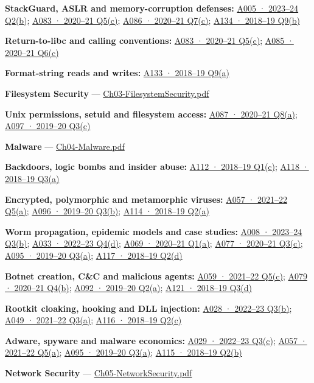 \documentclass[11pt,a4paper]{article}
\begin{document}
\textbf{StackGuard,\allowbreak{} ASLR and memory-corruption defenses:} \hyperref[a005]{A005 · 2023–24 Q2(b)}; \hyperref[a083]{A083 · 2020–21 Q5(c)}; \hyperref[a086]{A086 · 2020–21 Q7(c)}; \hyperref[a134]{A134 · 2018–19 Q9(b)}


\textbf{Return-to-libc and calling conventions:} \hyperref[a083]{A083 · 2020–21 Q5(c)}; \hyperref[a085]{A085 · 2020–21 Q6(c)}


\textbf{Format-string reads and writes:} \hyperref[a133]{A133 · 2018–19 Q9(a)}


\textbf{Filesystem Security} — \href{../slides/Ch03-FilesystemSecurity.pdf}{Ch03-FilesystemSecurity.\allowbreak{}pdf}


\textbf{Unix permissions,\allowbreak{} setuid and filesystem access:} \hyperref[a087]{A087 · 2020–21 Q8(a)}; \hyperref[a097]{A097 · 2019–20 Q3(c)}


\textbf{Malware} — \href{../slides/Ch04-Malware.pdf}{Ch04-Malware.\allowbreak{}pdf}


\textbf{Backdoors,\allowbreak{} logic bombs and insider abuse:} \hyperref[a112]{A112 · 2018–19 Q1(c)}; \hyperref[a118]{A118 · 2018–19 Q3(a)}


\textbf{Encrypted,\allowbreak{} polymorphic and metamorphic viruses:} \hyperref[a057]{A057 · 2021–22 Q5(a)}; \hyperref[a096]{A096 · 2019–20 Q3(b)}; \hyperref[a114]{A114 · 2018–19 Q2(a)}


\textbf{Worm propagation,\allowbreak{} epidemic models and case studies:} \hyperref[a008]{A008 · 2023–24 Q3(b)}; \hyperref[a033]{A033 · 2022–23 Q4(d)}; \hyperref[a069]{A069 · 2020–21 Q1(a)}; \hyperref[a077]{A077 · 2020–21 Q3(c)}; \hyperref[a095]{A095 · 2019–20 Q3(a)}; \hyperref[a117]{A117 · 2018–19 Q2(d)}


\textbf{Botnet creation,\allowbreak{} C\&C and malicious agents:} \hyperref[a059]{A059 · 2021–22 Q5(c)}; \hyperref[a079]{A079 · 2020–21 Q4(b)}; \hyperref[a092]{A092 · 2019–20 Q2(a)}; \hyperref[a121]{A121 · 2018–19 Q3(d)}


\textbf{Rootkit cloaking,\allowbreak{} hooking and DLL injection:} \hyperref[a028]{A028 · 2022–23 Q3(b)}; \hyperref[a049]{A049 · 2021–22 Q3(a)}; \hyperref[a116]{A116 · 2018–19 Q2(c)}


\textbf{Adware,\allowbreak{} spyware and malware economics:} \hyperref[a029]{A029 · 2022–23 Q3(c)}; \hyperref[a057]{A057 · 2021–22 Q5(a)}; \hyperref[a095]{A095 · 2019–20 Q3(a)}; \hyperref[a115]{A115 · 2018–19 Q2(b)}


\textbf{Network Security} — \href{../slides/Ch05-NetworkSecurity.pdf}{Ch05-NetworkSecurity.\allowbreak{}pdf}
\end{document}
